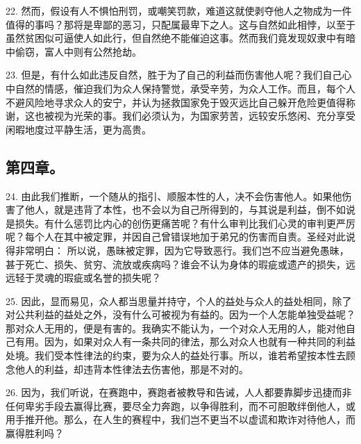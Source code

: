 22. 然而，假设有人不惧怕刑罚，或嘲笑罚款，难道这就使剥夺他人之物成为一件值得的事吗？那将是卑鄙的恶习，只配属最卑下之人。这与自然如此相悖，以至于虽然贫困似可逼使人如此行，但自然绝不能催迫这事。然而我们竟发现奴隶中有暗中偷窃，富人中则有公然抢劫。\par

23. 但是，有什么如此违反自然，胜于为了自己的利益而伤害他人呢？我们自己心中自然的情感，催迫我们为众人保持警觉，承受辛劳，为众人工作。而且，每个人不避风险地寻求众人的安宁，并认为拯救国家免于毁灭远比自己躲开危险更值得称谢，这也被视为光荣的事。我们必须认为，为国家劳苦，远较安乐悠闲、充分享受闲暇地度过平静生活，更为高贵。\par


\subsection{第四章。}

\par

24. 由此我们推断，一个随从的指引、顺服本性的人，决不会伤害他人。如果他伤害了他人，就是违背了本性，也不会以为自己所得到的，与其说是利益，倒不如说是损失。有什么惩罚比内心的创伤更痛苦呢？有什么审判比我们心灵的审判更严厉呢？每个人在其中被定罪，并因自己曾错误地加于弟兄的伤害而自责。圣经对此说得非常明白： 所以说，愚昧被定罪，因为它导致恶行。我们岂不应当避免愚昧，甚于死亡、损失、贫穷、流放或疾病吗？谁会不认为身体的瑕疵或遗产的损失，远远轻于灵魂的瑕疵或名誉的损失呢？\par

25. 因此，显而易见，众人都当思量并持守，个人的益处与众人的益处相同，除了对公共利益的益处之外，没有什么可被视为有益的。因为一个人怎能单独受益呢？那对众人无用的，便是有害的。我确实不能认为，一个对众人无用的人，能对他自己有用。因为，如果对众人有一条共同的律法，那么对众人也就有一种共同的利益处境。我们受本性律法的约束，要为众人的益处行事。所以，谁若希望按本性去顾念他人的利益，却违背本性律法去伤害他，那是不对的。\par

26. 因为，我们听说，在赛跑中，赛跑者被教导和告诫，人人都要靠脚步迅捷而非任何卑劣手段去赢得比赛，要尽全力奔跑，以争得胜利，而不可胆敢绊倒他人，或用手推开他。那么，在人生的赛程中，我们岂不更当不以虚谎和欺诈对待他人，而赢得胜利吗？\par

